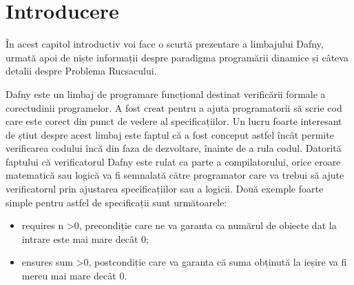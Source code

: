 \chapter*{Introducere} 

În acest capitol introductiv voi face o scurtă prezentare a limbajului Dafny, urmată apoi de niște informații despre paradigma programării dinamice și câteva detalii despre Problema Rucsacului. \par
Dafny este un limbaj de programare funcțional destinat verificării formale a corectudinii programelor. A fost creat pentru a ajuta programatorii să scrie cod care este corect din punct de vedere al specificațiilor. Un lucru foarte interesant de știut despre acest limbaj este faptul că a fost conceput astfel încât permite verificarea codului încă din faza de dezvoltare, înainte de a rula codul. Datorită faptului că verificatorul Dafny este rulat ca parte a compilatorului, orice eroare matematică sau logică va fi semnalată către programator care va trebui să ajute verificatorul prin ajustarea specificațiilor sau a logicii. Două exemple foarte simple pentru astfel de specificații sunt următoarele:
\begin{itemize}
    \item requires n \textgreater  0, precondiție care ne va garanta ca numărul de obiecte dat la intrare este mai mare decât 0;
    \item ensures sum \textgreater  0, postcondiție care va garanta că suma obținută la ieșire va fi mereu mai mare decât 0.
\end{itemize}